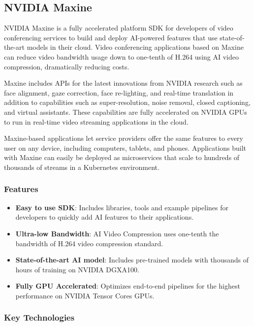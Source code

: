 \subsection{NVIDIA Maxine}

NVIDIA Maxine is a fully accelerated platform SDK for developers of video 
conferencing services to build and deploy AI-powered features that use state-of-the-art 
models in their cloud. Video conferencing applications based on Maxine can reduce video bandwidth usage down to one-tenth of H.264 using AI video compression, dramatically reducing costs.

Maxine includes APIs for the latest innovations from NVIDIA research such as face alignment, 
gaze correction, face re-lighting, and real-time translation in addition to capabilities such as super-resolution, noise removal, closed captioning, and virtual assistants. These capabilities are fully accelerated on NVIDIA GPUs to run in real-time video streaming applications in the cloud.

Maxine-based applications let service providers offer the same features to every user on any device,
including computers, tablets, and phones. Applications built with Maxine can easily be deployed as 
microservices that scale to hundreds of thousands of streams in a Kubernetes environment.~\cite{Maxine}

\subsubsection{Features}

\begin{itemize}
    \item \textbf{Easy to use SDK}: Includes libraries, tools and example pipelines 
    for developers to quickly add AI features to their applications.
    \item \textbf{Ultra-low Bandwidth}: AI Video Compression uses one-tenth the 
    bandwidth of H.264 video compression standard.
    \item \textbf{State-of-the-art AI model}: Includes pre-trained models with thousands of hours 
    of training on NVIDIA DGX\texttrademark A100.
    \item \textbf{Fully GPU Accelerated}: Optimizes end-to-end pipelines for the highest performance 
    on NVIDIA Tensor Cores GPUs.
\end{itemize}

\subsubsection{Key Technologies}

